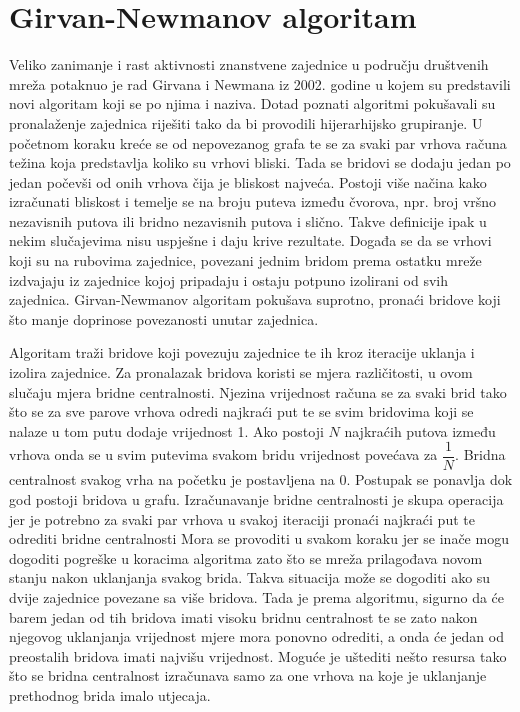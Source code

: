 \section{Girvan-Newmanov algoritam}

Veliko zanimanje i rast aktivnosti znanstvene zajednice u području društvenih mreža potaknuo je rad Girvana i Newmana iz 2002. godine \cite{girvan2002community} u kojem su predstavili novi algoritam koji se po njima i naziva. Dotad poznati algoritmi pokušavali su pronalaženje zajednica riješiti tako da bi provodili hijerarhijsko grupiranje. U početnom koraku kreće se od nepovezanog grafa te se za svaki par vrhova računa težina koja predstavlja koliko su vrhovi bliski. Tada se bridovi se dodaju jedan po jedan počevši od onih vrhova čija je bliskost najveća. Postoji više načina kako izračunati bliskost i temelje se na broju puteva između čvorova, npr. broj vršno nezavisnih putova ili bridno nezavisnih putova i slično. Takve definicije ipak u nekim slučajevima nisu uspješne i daju krive rezultate. Događa se da se vrhovi koji su na rubovima zajednice, povezani jednim bridom prema ostatku mreže izdvajaju iz zajednice kojoj pripadaju i ostaju potpuno izolirani od svih zajednica. Girvan-Newmanov algoritam pokušava suprotno, pronaći bridove koji što manje doprinose povezanosti unutar zajednica. 

Algoritam traži bridove koji povezuju zajednice te ih kroz iteracije uklanja i izolira zajednice. Za pronalazak bridova koristi se mjera različitosti, u ovom slučaju mjera bridne centralnosti. Njezina vrijednost računa se za svaki brid tako što se za sve parove vrhova odredi najkraći put te se svim bridovima koji se nalaze u tom putu dodaje vrijednost 1. Ako postoji $N$ najkraćih putova između vrhova onda se u svim putevima svakom bridu vrijednost povećava za $ \dfrac{1}{N} $. Bridna centralnost svakog vrha na početku je postavljena na 0. Postupak se ponavlja dok god postoji bridova u grafu. Izračunavanje bridne centralnosti je skupa operacija jer je potrebno za svaki par vrhova u svakoj iteraciji pronaći najkraći put te odrediti bridne centralnosti Mora se provoditi u svakom koraku jer se inače mogu dogoditi pogreške u koracima algoritma zato što se mreža prilagođava novom stanju nakon uklanjanja svakog brida. Takva situacija može se dogoditi ako su dvije zajednice povezane sa više bridova. Tada je prema algoritmu, sigurno da će barem jedan od tih bridova imati visoku bridnu centralnost te se zato nakon njegovog uklanjanja vrijednost mjere mora ponovno odrediti, a onda će jedan od preostalih bridova imati najvišu vrijednost. Moguće je uštediti nešto resursa tako što se bridna centralnost izračunava samo za one vrhova na koje je uklanjanje prethodnog brida imalo utjecaja. 

